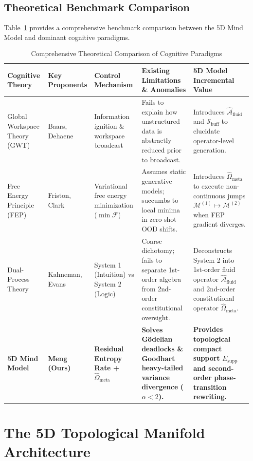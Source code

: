 \documentclass[journal,twocolumn,10pt]{IEEEtran}
\begin{document}
\subsection{Theoretical Benchmark Comparison}
Table~\ref{tab:theoretical_comparison} provides a comprehensive benchmark comparison between the 5D Mind Model and dominant cognitive paradigms.

\begin{table}[htbp]
\caption{Comprehensive Theoretical Comparison of Cognitive Paradigms}
\label{tab:theoretical_comparison}
\centering
\small
\begin{tabular}{p{2.3cm}p{1.8cm}p{2.0cm}p{4.2cm}p{5.5cm}}
\toprule
\textbf{Cognitive Theory} & \textbf{Key Proponents} & \textbf{Control Mechanism} & \textbf{Existing Limitations \& Anomalies} & \textbf{5D Model Incremental Value} \\
\midrule
Global Workspace Theory (GWT) & Baars, Dehaene & Information ignition \& workspace broadcast & Fails to explain how unstructured data is abstractly reduced prior to broadcast. & Introduces $\hat{\mathcal{A}}_{\text{fluid}}$ and $\mathcal{S}_{\text{buff}}$ to elucidate operator-level generation. \\
\midrule
Free Energy Principle (FEP) & Friston, Clark & Variational free energy minimization ($\min \mathcal{F}$) & Assumes static generative models; succumbs to local minima in zero-shot OOD shifts. & Introduces $\hat{\Omega}_{\text{meta}}$ to execute non-continuous jumps $\mathcal{M}^{(1)} \mapsto \mathcal{M}^{(2)}$ when FEP gradient diverges. \\
\midrule
Dual-Process Theory & Kahneman, Evans & System 1 (Intuition) vs System 2 (Logic) & Coarse dichotomy; fails to separate 1st-order algebra from 2nd-order constitutional oversight. & Deconstructs System 2 into 1st-order fluid operator $\hat{\mathcal{A}}_{\text{fluid}}$ and 2nd-order constitutional operator $\hat{\Omega}_{\text{meta}}$. \\
\midrule
\textbf{5D Mind Model} & \textbf{Meng (Ours)} & \textbf{Residual Entropy Rate + $\hat{\Omega}_{\text{meta}}$} & \textbf{Solves G\"odelian deadlocks \& Goodhart heavy-tailed variance divergence ($\alpha < 2$).} & \textbf{Provides topological compact support $E_{\text{supp}}$ and second-order phase-transition rewriting.} \\
\bottomrule
\end{tabular}
\end{table}

\section{The 5D Topological Manifold Architecture}
\end{document}
